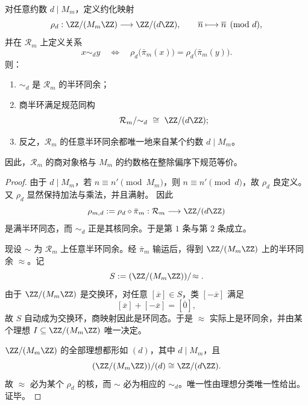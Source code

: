 \begin{theorem}\label{thm:xi-fold-congruence-quotient-divisor-lattice}
对任意约数 \(d\mid M_m\)，定义约化映射
\[
\rho_d:\ZZ/(M_m\ZZ)\longrightarrow \ZZ/(d\ZZ),
\qquad
\overline n\longmapsto \overline n \pmod d,
\]
并在 \(\mathcal R_m\) 上定义关系
\[
x\sim_d y
\quad\Longleftrightarrow\quad
\rho_d\!\bigl(\bar\pi_m(x)\bigr)=\rho_d\!\bigl(\bar\pi_m(y)\bigr).
\]
则：
\begin{enumerate}
  \item \(\sim_d\) 是 \(\mathcal R_m\) 的半环同余；
  \item 商半环满足规范同构
  \[
  \mathcal R_m/{\sim_d}\ \cong\ \ZZ/(d\ZZ);
  \]
  \item 反之，\(\mathcal R_m\) 的任意半环同余都唯一地来自某个约数 \(d\mid M_m\)。
\end{enumerate}
因此，\(\mathcal R_m\) 的商对象格与 \(M_m\) 的约数格在整除偏序下规范等价。
\end{theorem}
\begin{proof}
由于 \(d\mid M_m\)，若 \(n\equiv n'\pmod{M_m}\)，则 \(n\equiv n'\pmod d\)，故 \(\rho_d\) 良定义。又 \(\rho_d\) 显然保持加法与乘法，并且满射。
因此
\[
\rho_{m,d}:=\rho_d\circ \bar\pi_m:\mathcal R_m\longrightarrow \ZZ/(d\ZZ)
\]
是满半环同态，而 \(\sim_d\) 正是其核同余。于是第 \(1\) 条与第 \(2\) 条成立。

现设 \(\sim\) 为 \(\mathcal R_m\) 上任意半环同余。经 \(\bar\pi_m\) 输运后，得到 \(\ZZ/(M_m\ZZ)\) 上的半环同余 \(\approx\)。记
\[
S:=(\ZZ/(M_m\ZZ))/\!\approx.
\]
由于 \(\ZZ/(M_m\ZZ)\) 是交换环，对任意 \([\overline x]\in S\)，类 \([-\overline x]\) 满足
\[
[\overline x]+[-\overline x]=[\overline 0],
\]
故 \(S\) 自动成为交换环，商映射因此是环同态。于是 \(\approx\) 实际上是环同余，并由某个理想 \(I\subseteq \ZZ/(M_m\ZZ)\) 唯一决定。

\(\ZZ/(M_m\ZZ)\) 的全部理想都形如 \((d)\)，其中 \(d\mid M_m\)，且
\[
(\ZZ/(M_m\ZZ))/(d)\cong \ZZ/(d\ZZ).
\]
故 \(\approx\) 必为某个 \(\rho_d\) 的核，而 \(\sim\) 必为相应的 \(\sim_d\)。唯一性由理想分类唯一性给出。证毕。
\end{proof}

